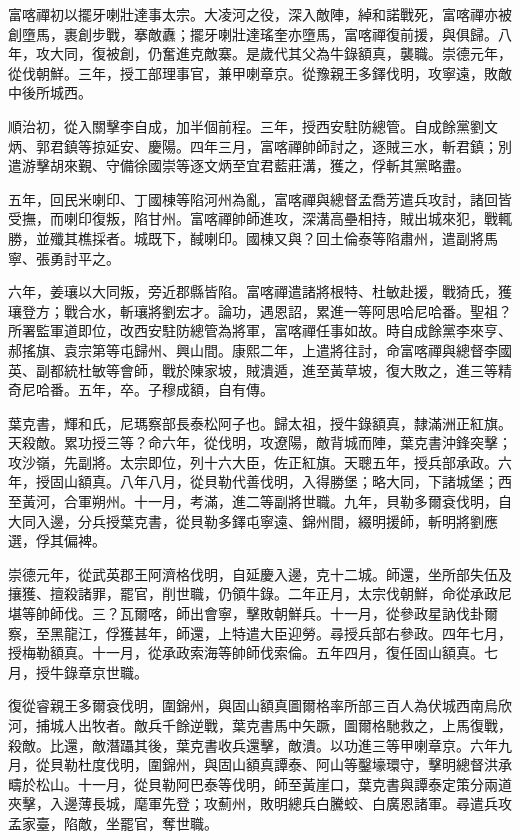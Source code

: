 \begin{pinyinscope}
富喀禪初以擺牙喇壯達事太宗。大凌河之役，深入敵陣，綽和諾戰死，富喀禪亦被創墮馬，裹創步戰，搴敵纛；擺牙喇壯達瑤奎亦墮馬，富喀禪復前援，與俱歸。八年，攻大同，復被創，仍奮進克敵寨。是歲代其父為牛錄額真，襲職。崇德元年，從伐朝鮮。三年，授工部理事官，兼甲喇章京。從豫親王多鐸伐明，攻寧遠，敗敵中後所城西。

順治初，從入關擊李自成，加半個前程。三年，授西安駐防總管。自成餘黨劉文炳、郭君鎮等掠延安、慶陽。四年三月，富喀禪帥師討之，逐賊三水，斬君鎮；別遣游擊胡來覲、守備徐國崇等逐文炳至宜君藍莊溝，獲之，俘斬其黨略盡。

五年，回民米喇印、丁國棟等陷河州為亂，富喀禪與總督孟喬芳遣兵攻討，諸回皆受撫，而喇印復叛，陷甘州。富喀禪帥師進攻，深溝高壘相持，賊出城來犯，戰輒勝，並殲其樵採者。城既下，馘喇印。國棟又與？回土倫泰等陷肅州，遣副將馬寧、張勇討平之。

六年，姜瓖以大同叛，旁近郡縣皆陷。富喀禪遣諸將根特、杜敏赴援，戰猗氏，獲瓖登方；戰合水，斬瓖將劉宏才。論功，遇恩詔，累進一等阿思哈尼哈番。聖祖？所署監軍道即位，改西安駐防總管為將軍，富喀禪任事如故。時自成餘黨李來亨、郝搖旗、袁宗第等屯歸州、興山間。康熙二年，上遣將往討，命富喀禪與總督李國英、副都統杜敏等會師，戰於陳家坡，賊潰遁，進至黃草坡，復大敗之，進三等精奇尼哈番。五年，卒。子穆成額，自有傳。

葉克書，輝和氏，尼瑪察部長泰松阿子也。歸太祖，授牛錄額真，隸滿洲正紅旗。天殺敵。累功授三等？命六年，從伐明，攻遼陽，敵背城而陣，葉克書沖鋒突擊；攻沙嶺，先副將。太宗即位，列十六大臣，佐正紅旗。天聰五年，授兵部承政。六年，授固山額真。八年八月，從貝勒代善伐明，入得勝堡；略大同，下諸城堡；西至黃河，合軍朔州。十一月，考滿，進二等副將世職。九年，貝勒多爾袞伐明，自大同入邊，分兵授葉克書，從貝勒多鐸屯寧遠、錦州間，綴明援師，斬明將劉應選，俘其偏裨。

崇德元年，從武英郡王阿濟格伐明，自延慶入邊，克十二城。師還，坐所部失伍及攘獲、擅殺諸罪，罷官，削世職，仍領牛錄。二年正月，太宗伐朝鮮，命從承政尼堪等帥師伐。三？瓦爾喀，師出會寧，擊敗朝鮮兵。十一月，從參政星訥伐卦爾察，至黑龍江，俘獲甚年，師還，上特遣大臣迎勞。尋授兵部右參政。四年七月，授梅勒額真。十一月，從承政索海等帥師伐索倫。五年四月，復任固山額真。七月，授牛錄章京世職。

復從睿親王多爾袞伐明，圍錦州，與固山額真圖爾格率所部三百人為伏城西南烏欣河，捕城人出牧者。敵兵千餘逆戰，葉克書馬中矢蹶，圖爾格馳救之，上馬復戰，殺敵。比還，敵潛躡其後，葉克書收兵還擊，敵潰。以功進三等甲喇章京。六年九月，從貝勒杜度伐明，圍錦州，與固山額真譚泰、阿山等鑿壕環守，擊明總督洪承疇於松山。十一月，從貝勒阿巴泰等伐明，師至黃崖口，葉克書與譚泰定策分兩道夾擊，入邊薄長城，麾軍先登；攻薊州，敗明總兵白騰蛟、白廣恩諸軍。尋遣兵攻孟家臺，陷敵，坐罷官，奪世職。


\end{pinyinscope}

